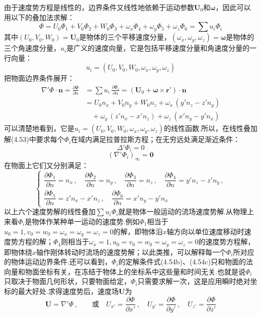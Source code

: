 由于速度势方程是线性的，边界条件又线性地依赖于运动参数$\boldsymbol{U}_0$和$\boldsymbol{\omega}$，因此可以用以下的叠加法求解：
\begin{equation*}
\Phi=U_0\Phi_1+V_0\Phi_2+W_0\Phi_3+\omega_x\Phi_4+\omega_y\Phi_5+\omega_z\Phi_6=\sum u_i\Phi_i
\tag{4.53}
\end{equation*}
其中$(U_0,V_0,W_0)=\boldsymbol{U}_0$是物体的三个平移速度分量，$(\omega_x,\omega_y,\omega_z)=\boldsymbol{\omega}$是物体的三个角速度分量，$u_i$是广义的速度向量，它是包括平移速度分量和角速度分量的一行向量：
\[
u_i=(U_0,V_0,W_0,\omega_x,\omega_y,\omega_z)
\]
把物面边界条件展开：
\begin{align*}
\nabla'\Phi\cdot\boldsymbol{n}=\frac{\partial\Phi}{\partial n}&=\sum u_i\,\frac{\partial\Phi_i}{\partial n}=(\boldsymbol{U}_0+\boldsymbol{\omega}\times\boldsymbol{r}')\cdot\boldsymbol{n}\\
&=U_0 n_x+V_0 n_y+W_0 n_z+\omega_x\,(y'n_z-z'n_y)\\
&\quad+\omega_y\,(z'n_x-x'n_z)+\omega_z\,(x'n_y-y'n_x)
\end{align*}
可以清楚地看到，它是$u_i=(U_0,V_0,W_0,\omega_x,\omega_y,\omega_z)$的线性函数.所以，在线性叠加解(4.53)中要求每个$\Phi_i$在域内满足拉普拉斯方程；在无穷远处满足渐近条件：
\begin{equation*}
\Delta'\Phi_i=0
\tag{4.54a}
\end{equation*}
\begin{equation*}
(\nabla'\Phi_i)_\infty=\boldsymbol{0}
\tag{4.54b}
\end{equation*}
在物面上它们又分别满足：
\begin{equation*}
\begin{cases}
\dfrac{\partial\Phi_1}{\partial n}=n_x\,,\quad \dfrac{\partial\Phi_2}{\partial n}=n_y\,,\quad \dfrac{\partial\Phi_3}{\partial n}=n_z\,,\quad \dfrac{\partial\Phi_4}{\partial n}=y'n_z-z'n_y\,,\\[8pt]
\dfrac{\partial\Phi_5}{\partial n}=z'n_x-x'n_z\,,\quad \dfrac{\partial\Phi_6}{\partial n}=x'n_y-y'n_x
\end{cases}
\tag{4.54c}
\end{equation*}
以上六个速度势解的线性叠加$\sum u_i\Phi_i$就是物体一般运动的流场速度势解.从物理上来看$\Phi_i$是物体作某种单一运动的速度势.例如$\Phi_1$相当于$u_0=1,v_0=w_0=\omega_x=\omega_y=\omega_z=0$的解，即物体沿$x$轴方向以单位速度移动时速度势方程的解；$\Phi_4$则相当于$\omega_x=1,u_0=v_0=w_0=\omega_y=\omega_z=0$的速度势方程解，即物体绕$x$轴作刚体转动时流场的速度势解；以此类推，可以解释每一个$\Phi_i$所对应的物体运动边界条件.还可以看到，$\Phi_i$的定解条件式(4.54b)、(4.54c)只和物面的法向量和物面坐标有关，在冻结于物体上的坐标系中这些量和时间无关.也就是说$\Phi_i$只取决于物面几何形状，只要物面给定，$\Phi_i$只需要求解一次，这是应用瞬时绝对坐标的最大好处.求得速度势后，速度场$\boldsymbol{U}$为
\[
\boldsymbol{U}=\nabla'\Phi\,,\qquad \text{或}\quad U_{x'}=\frac{\partial\Phi}{\partial x'}\,,\quad U_{y'}=\frac{\partial\Phi}{\partial y'}\,,\quad U_{z'}=\frac{\partial\Phi}{\partial z'}
\]

